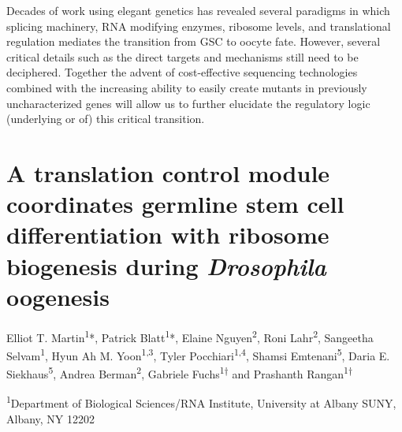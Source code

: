 \documentclass[12pt,oneside]{reedthesis}
\begin{document}
Decades of work using elegant genetics has revealed several paradigms in
which splicing machinery, RNA modifying enzymes, ribosome levels, and
translational regulation mediates the transition from GSC to oocyte
fate. However, several critical details such as the direct targets and
mechanisms still need to be deciphered. Together the advent of
cost-effective sequencing technologies combined with the increasing
ability to easily create mutants in previously uncharacterized genes
will allow us to further elucidate the regulatory logic (underlying or
of) this critical transition.





























\hypertarget{a-translation-control-module-coordinates-germline-stem-cell-differentiation-with-ribosome-biogenesis-during-drosophila-oogenesis}{%
\chapter{\texorpdfstring{A translation control module coordinates germline stem cell differentiation with ribosome biogenesis during \emph{Drosophila} oogenesis}{A translation control module coordinates germline stem cell differentiation with ribosome biogenesis during Drosophila oogenesis}}\label{a-translation-control-module-coordinates-germline-stem-cell-differentiation-with-ribosome-biogenesis-during-drosophila-oogenesis}}

Elliot T. Martin\textsuperscript{1}*, Patrick Blatt\textsuperscript{1}*, Elaine Nguyen\textsuperscript{2}, Roni
Lahr\textsuperscript{2}, Sangeetha Selvam\textsuperscript{1}, Hyun Ah M. Yoon\textsuperscript{1,3}, Tyler
Pocchiari\textsuperscript{1,4}, Shamsi Emtenani\textsuperscript{5}, Daria E. Siekhaus\textsuperscript{5}, Andrea
Berman\textsuperscript{2}, Gabriele Fuchs\textsuperscript{1†} and Prashanth Rangan\textsuperscript{1†}

\textsuperscript{1}Department of Biological Sciences/RNA Institute, University at Albany
SUNY, Albany, NY 12202
\end{document}
